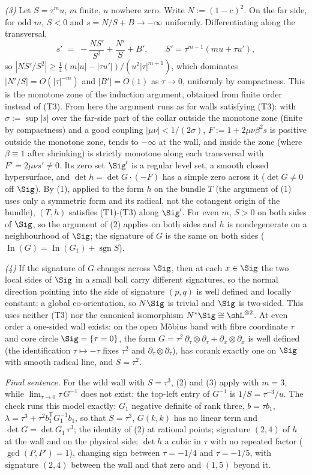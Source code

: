\emph{(3)} Let $S = \tau^m u$, $m$ finite, $u$ nowhere zero. Write $N := (1-c)^2$. On the far side, for odd $m$, $S < 0$ and $s = N/S + B \to -\infty$ uniformly. Differentiating along the transversal,
\[
s' \;=\; -\frac{N S'}{S^2} + \frac{N'}{S} + B', \qquad S' = \tau^{m-1}(m u + \tau u'),
\]
so $|N S'/S^2| \geq \tfrac14 (m|u| - |\tau u'|)/(u^2 |\tau|^{m+1})$, which dominates $|N'/S| = O(|\tau|^{-m})$ and $|B'| = O(1)$ as $\tau \to 0$, uniformly by compactness. This is the monotone zone of the induction argument, obtained from finite order instead of (T3). From here the argument runs as for walls satisfying (T3): with $\sigma := \sup |s|$ over the far-side part of the collar outside the monotone zone (finite by compactness) and a good coupling $|\mu\nu| < 1/(2\sigma)$, $F := 1 + 2\mu\nu\beta^2 s$ is positive outside the monotone zone, tends to $-\infty$ at the wall, and inside the zone (where $\beta \equiv 1$ after shrinking) is strictly monotone along each transversal with $F' = 2\mu\nu s' \neq 0$. Its zero set $\Sig'$ is a regular level set, a smooth closed hypersurface, and $\det h = \det G \cdot (-F)$ has a simple zero across it ($\det G \neq 0$ off $\Sig$). By (1), applied to the form $h$ on the bundle $T$ (the argument of (1) uses only a symmetric form and its radical, not the cotangent origin of the bundle), $(T, h)$ satisfies (T1)-(T3) along $\Sig'$. For even $m$, $S > 0$ on both sides of $\Sig$, so the argument of (2) applies on both sides and $h$ is nondegenerate on a neighbourhood of $\Sig$; the signature of $G$ is the same on both sides ($\operatorname{In}(G) = \operatorname{In}(G_1) + \operatorname{sgn} S$).

\emph{(4)} If the signature of $G$ changes across $\Sig$, then at each $x \in \Sig$ the two local sides of $\Sig$ in a small ball carry different signatures, so the normal direction pointing into the side of signature $(p,q)$ is well defined and locally constant: a global co-orientation, so $N\Sig$ is trivial and $\Sig$ is two-sided. This uses neither (T3) nor the canonical isomorphism $N^*\Sig \cong \shL^{\otimes 2}$. At even order a one-sided wall exists: on the open M\"obius band with fibre coordinate $\tau$ and core circle $\Sig = \{\tau = 0\}$, the form $G = \tau^2\, \partial_\tau \otimes \partial_\tau + \partial_x \otimes \partial_x$ is well defined (the identification $\tau \mapsto -\tau$ fixes $\tau^2$ and $\partial_\tau \otimes \partial_\tau$), has corank exactly one on $\Sig$ with smooth radical line, and $S = \tau^2$.

\emph{Final sentence.} For the wild wall with $S = \tau^3$, (2) and (3) apply with $m = 3$, while $\lim_{\tau \to 0} \tau\, G^{-1}$ does not exist: the top-left entry of $G^{-1}$ is $1/S = \tau^{-3}/u$. The check runs this model exactly: $G_1$ negative definite of rank three, $b = \tau b_1$, $\lambda = \tau^3 + \tau^2 b_1^{\mathsf T} G_1^{-1} b_1$, so that $S = \tau^3$, $G(k,k)$ has no linear term and $\det G = \det G_1\, \tau^3$; the identity of (2) at rational points; signature $(2,4)$ of $h$ at the wall and on the physical side; $\det h$ a cubic in $\tau$ with no repeated factor ($\gcd(P, P') = 1$), changing sign between $\tau = -1/4$ and $\tau = -1/5$, with signature $(2,4)$ between the wall and that zero and $(1,5)$ beyond it.

